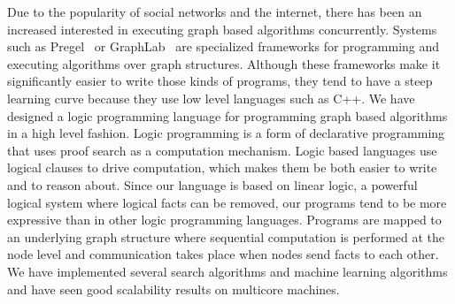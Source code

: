 Due to the popularity of social networks and the internet, there has been an increased interested
in executing graph based algorithms concurrently. Systems such as Pregel~\cite{Malewicz:2010:PSL:1807167.1807184}
or GraphLab~\cite{GraphLab2010} are specialized frameworks for programming and executing algorithms
over graph structures. Although these frameworks make it significantly easier to write those kinds
of programs, they tend to have a steep learning curve because they use low level languages such as
C++. We have designed a logic programming language for programming graph based algorithms in a high
level fashion. Logic programming is a form of declarative programming that uses proof search as a
computation mechanism. Logic based languages use logical clauses to drive computation, which makes
them be both easier to write and to reason about.  Since our language is based on linear logic, a
powerful logical system where logical facts can be removed, our programs tend to be more expressive
than in other logic programming languages. Programs are mapped to an underlying graph structure where
sequential computation is performed at the node level and communication takes place when nodes send
facts to each other. We have implemented several search algorithms and machine learning algorithms
and have seen good scalability results on multicore machines.
